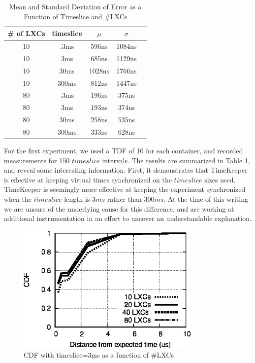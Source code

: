 \begin{table}\centering 
\begin{tabular}{|c|c|c|c|c|} 
        \hline 
       \# of LXCs & timeslice & $\mu$ & $\sigma$ \\ \hline 
        10 & .3ms & 596ns & 1084ns \\ \hline 
        10 & 3ms & 685ns & 1129ns \\ \hline 
        10 & 30ms & 1028ns & 1766ns \\ \hline 
        10 & 300ms & 812ns & 1447ns \\ \hline 
        80 & .3ms & 196ns & 375ns \\ \hline 
        80 & 3ms & 193ns & 374ns \\ \hline 
        80 & 30ms & 258ns & 535ns \\ \hline 
        80 & 300ms & 333ns & 628ns \\ \hline 
        \hline 
        \end{tabular} 
        \caption{Mean and Standard Deviation of Error as a Function of Timeslice and \#LXCs} 
        \label{table:msesamedil} 
\end{table}

For the first experiment, we used a TDF of 10 for each container, and recorded measurements for 150 $timeslice$ intervals. The results are summarized in Table \ref{table:msesamedil}, and reveal some interesting information. First, it demonstrates that TimeKeeper is effective at keeping virtual times synchronized on the $timeslice$ sizes used. TimeKeeper is seemingly more effective at keeping the experiment synchronized when the $timeslice$ length is 3$ms$ rather than 300$ms$. At the time of this writing we are unsure of the underlying cause for this difference, and are working at additional 
instrumentation in an effort to uncover an understandable explanation.

\begin{figure} \centering  
      \includegraphics[width=0.8\textwidth]{images/cdf_3ms_xnodes.eps} 
    \caption{CDF with timeslice=3ms as a function of \#LXCs} 
    \label{fig:sync1} 
  \end{figure} 

